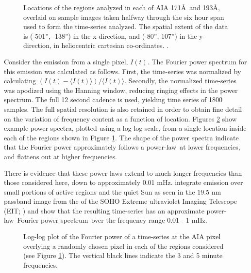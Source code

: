 \documentclass{aastex}
\newcommand{\PS}{power spectrum}
\newcommand{\PL}{power-law}
\newcommand{\Fps}{Fourier \PS}
\begin{document}
\begin{figure}
\centerline{
}
\caption{Locations of the regions analyzed in each of AIA 171\AA\ and
  193\AA, overlaid on sample images taken halfway through the six hour
  span used to form the time-series analyzed.  The spatial extent of
  the data is (-501'', -138'') in the x-direction, and (-80'', 107'')
  in the y-direction, in heliocentric cartesian co-ordinates.
  \citep{2006A&A...449..791T}.}
\label{fig:loc171193}
\end{figure}

Consider the emission from a single pixel, $I(t)$.  The Fourier power
spectrum for this emission was calculated as follows.  First, the
time-series was normalized by calculating $(I(t) - \langle I(t)
\rangle)/\langle I(t) \rangle$. Secondly, the normalized time-series
was apodized using the Hanning window, reducing ringing effects in the
\PS.  The full 12 second cadence is used, yielding time series of 1800
samples.  The full spatial resolution is also retained in order to
obtain fine detail on the variation of frequency content as a function
of location.  Figures \ref{fig:compare171193} show example power
spectra, plotted using a log-log scale, from a single location inside
each of the regions shown in Figure \ref{fig:loc171193}.  The shape of
the power spectra indicate that the Fourier power approximately
follows a \PL\ at lower frequencies, and flattens out at higher
frequencies.

There is evidence that these power laws extend to much longer
frequencies than those considered here, down to approximately 0.01
mHz. \cite{2014AA...563A...8A} integrate emission over small portions
of active regions and the quiet Sun as seen in the 19.5 nm passband
image from the of the SOHO \cite{1995SoPh..162....1D} Extreme
ultraviolet Imaging Telescope (EIT; \cite{1995SoPh..162..291D}) and
show that the resulting time-series has an approximate \PL\ \Fps\ over
the frequency range 0.01 - 1 mHz.

\begin{figure}
\centerline{
}
\centerline{
}
\caption{Log-log plot of the Fourier power of a time-series at the AIA
  pixel overlying a randomly chosen pixel in each of the regions
  considered (see Figure \protect\ref{fig:loc171193}).  The vertical
  black lines indicate the 3 and 5 minute frequencies.}
\label{fig:compare171193}
\end{figure}
\end{document}
